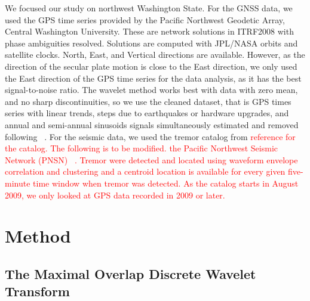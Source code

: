 \documentclass{article}
\begin{document}
We focused our study on northwest Washington State. For the GNSS data, we used the GPS time series provided by the Pacific Northwest Geodetic Array, Central Washington University. These are network solutions in ITRF2008 with phase ambiguities resolved. Solutions are computed with JPL/NASA orbits and satellite clocks. North, East, and Vertical directions are available. However, as the direction of the secular plate motion is close to the East direction, we only used the East direction of the GPS time series for the data analysis, as it has the best signal-to-noise ratio. The wavelet method works best with data with zero mean, and no sharp discontinuities, so we use the cleaned dataset, that is GPS times series with linear trends, steps due to earthquakes or hardware upgrades, and annual and semi-annual sinusoids signals simultaneously estimated and removed following ~\citet{SZE_2004}. For the seismic data, we used the tremor catalog from \textcolor{red}{reference for the catalog. The following is to be modified. the Pacific Northwest Seismic Network (PNSN) ~\citep{WEC_2010}. Tremor were detected and located using waveform envelope correlation and clustering and a centroid location is available for every given five-minute time window when tremor was detected. As the catalog starts in August 2009, we only looked at GPS data recorded in 2009 or later.} \\

\section{Method} 

\subsection{The Maximal Overlap Discrete Wavelet Transform}
\end{document}
